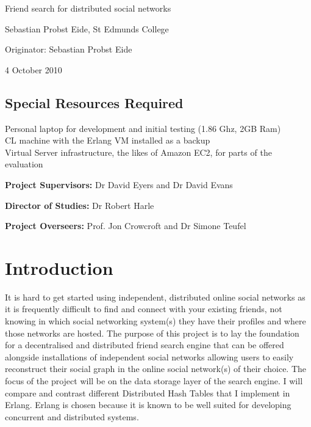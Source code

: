 

\vfil

\centerline{\Large Friend search for distributed social networks }
\vspace{0.4in}
\centerline{\large Sebastian Probst Eide, St Edmunds College }
\vspace{0.3in}
\centerline{\large Originator: Sebastian Probst Eide}
\vspace{0.3in}
\centerline{\large 4 October 2010}

\vfil

\subsection*{Special Resources Required}
Personal laptop for development and initial testing (1.86 Ghz, 2GB Ram) \\
CL machine with the Erlang VM installed as a backup \\
Virtual Server infrastructure, the likes of Amazon EC2, for parts of the evaluation \\
\vspace{0.2in}

\noindent
{\bf Project Supervisors:} Dr David Eyers and Dr David Evans
\vspace{0.2in}

\noindent
{\bf Director of Studies:} Dr Robert Harle
\vspace{0.2in}
\noindent
 
\noindent
{\bf Project Overseers:} Prof. Jon Crowcroft and Dr Simone Teufel

\vfil
\pagebreak


\section*{Introduction}

It is hard to get started using independent, distributed online social networks as it is frequently difficult to find and connect with your existing friends, not knowing in which social networking system(s) they have their profiles and where those networks are hosted. The purpose of this project is to lay the foundation for a decentralised and distributed friend search engine that can be offered alongside installations of independent social networks allowing users to easily reconstruct their social graph in the online social network(s) of their choice. The focus of the project will be on the data storage layer of the search engine. I will compare and contrast different Distributed Hash Tables that I implement in Erlang. Erlang is chosen because it is known to be well suited for developing concurrent and distributed systems.

